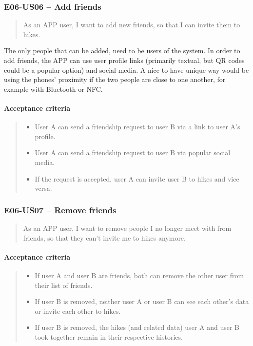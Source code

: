 
\subsubsection*{E06-US06 -- Add friends}
\begin{quote}
As an APP user, I want to add new friends, so that I can invite them to hikes.
\end{quote}

The only people that can be added, need to be users of the system.
In order to add friends, the APP can use user profile links (primarily textual, but QR codes could be a popular option) and social media.
A nice-to-have unique way would be using the phones' proximity if the two people are close to one another, for example with Bluetooth or NFC.

\paragraph*{Acceptance criteria}
\begin{quote}
\begin{itemize}
    \item User A can send a friendship request to user B via a link to user A's profile.
    \item User A can send a friendship request to user B via popular social media.
    \item If the request is accepted, user A can invite user B to hikes and vice versa.
\end{itemize}
\end{quote}

\subsubsection*{E06-US07 -- Remove friends}
\begin{quote}
As an APP user, I want to remove people I no longer meet with from friends, so that they can't invite me to hikes anymore.
\end{quote}

\paragraph*{Acceptance criteria}
\begin{quote}
\begin{itemize}
    \item If user A and user B are friends, both can remove the other user from their list of friends.
    \item If user B is removed, neither user A or user B can see each other's data or invite each other to hikes.
    \item If user B is removed, the hikes (and related data) user A and user B took together remain in their respective histories.
\end{itemize}
\end{quote}

